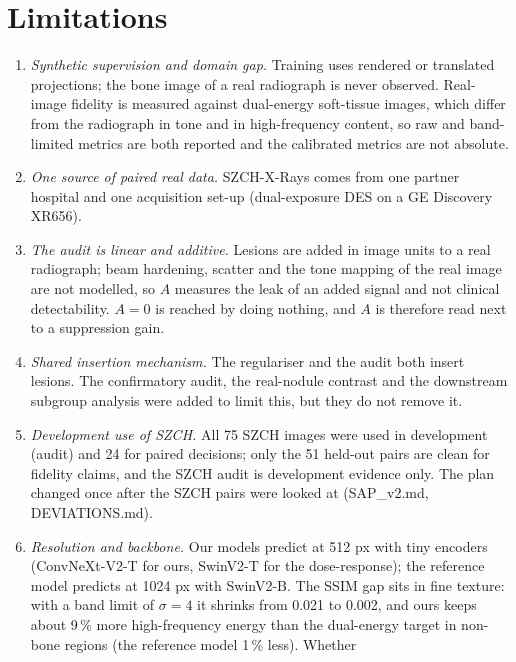 \section{Limitations}
\label{sec:limitations}
\begin{enumerate}
\item \emph{Synthetic supervision and domain gap.} Training uses rendered or translated projections; the bone image of a real radiograph is never
 observed. Real-image fidelity is measured against dual-energy soft-tissue images, which differ from the radiograph in tone and in high-frequency
 content, so raw and band-limited metrics are both reported and the calibrated metrics are not absolute.
\item \emph{One source of paired real data.} SZCH-X-Rays comes from one partner hospital and one acquisition set-up (dual-exposure DES on a GE Discovery XR656).
\item \emph{The audit is linear and additive.} Lesions are added in image units to a real radiograph; beam hardening, scatter and the tone mapping of
 the real image are not modelled, so $A$ measures the leak of an added signal and not clinical detectability. $A=0$ is reached by doing nothing, and
 $A$ is therefore read next to a suppression gain.
\item \emph{Shared insertion mechanism.} The regulariser and the audit both insert lesions. The confirmatory audit, the real-nodule contrast and the
 downstream subgroup analysis were added to limit this, but they do not remove it.
\item \emph{Development use of SZCH.} All 75 SZCH images were used in development (audit) and 24 for paired decisions; only the 51 held-out pairs are
 clean for fidelity claims, and the SZCH audit is development evidence only. The plan changed once after the SZCH pairs were looked at
 (SAP\_v2.md, DEVIATIONS.md).
\item \emph{Resolution and backbone.} Our models predict at 512 px with tiny encoders (ConvNeXt-V2-T for ours, SwinV2-T for the dose-response);
 the reference model predicts at 1024 px with SwinV2-B. The SSIM gap sits in fine texture: with a band limit of $\sigma=4$ it shrinks from 0.021 to
 0.002, and ours keeps about 9\,\% more high-frequency energy than the dual-energy target in non-bone regions (the reference model 1\,\% less). Whether

\end{enumerate}
